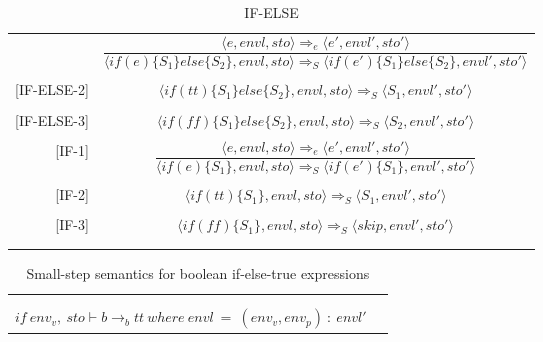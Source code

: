 \begin{longtable}[c] { r c }
  \centering
  [IF-ELSE-1] & \( 
    \dfrac { \langle e, envl, sto \rangle \Rightarrow_e \langle e', envl', sto' \rangle }
      { \langle if (e) \{S_1\} else \{S_2\}, envl, sto \rangle \Rightarrow_S \langle if (e') \{S_1\} else \{S_2\}, envl', sto' \rangle } \)
  \\
  & \\

  [IF-ELSE-2] & \( 
    \langle if (tt) \{S_1\} else \{S_2\}, envl, sto \rangle \Rightarrow_S \langle S_1, envl', sto' \rangle \)
  \\
  & \\

  [IF-ELSE-3] & \( 
    \langle if (ff) \{S_1\} else \{S_2\}, envl, sto \rangle \Rightarrow_S \langle S_2, envl', sto' \rangle \)
  \\
  & \\

  [IF-1] & \( 
    \dfrac { \langle e, envl, sto \rangle \Rightarrow_e \langle e', envl', sto' \rangle }
      { \langle if (e) \{S_1\}, envl, sto \rangle \Rightarrow_S \langle if (e') \{S_1\}, envl', sto' \rangle } \)
  \\
  & \\

  [IF-2] & \( 
    \langle if (tt) \{S_1\}, envl, sto \rangle \Rightarrow_S \langle S_1, envl', sto' \rangle \)
  \\
  & \\

  [IF-3] & \( 
    \langle if (ff) \{S_1\}, envl, sto \rangle \Rightarrow_S \langle skip, envl', sto' \rangle \)
  \\
  & \\

  \caption{IF-ELSE}
\end{longtable}   
        
        
\begin{table}[H]
    \centering
    \begin{longtable}[c] { r c }
    
    \begin{tabular}{@{}c@{}} 
    [IF-ELSE-TRUE] \\
    \newline
    \end{tabular}
  \begin{tabular}{@{}c@{}}   \(
  \langle if \ {b} \ then \ {S_1} \ else \ {S_2} \ sto, envl\rangle \Rightarrow \langle{S_1},sto,envl\rangle
  \)  \\ \(
  if \ env_v, \ sto \vdash b \rightarrow_b {tt} \ where \ envl \ = \ (env_v, env_p) \ : \ envl' 
  \) 
  \end{tabular}
        
 \end{longtable}
    \caption{Small-step semantics for boolean if-else-true expressions}\label{sem:if-else-true}
\end{table}

